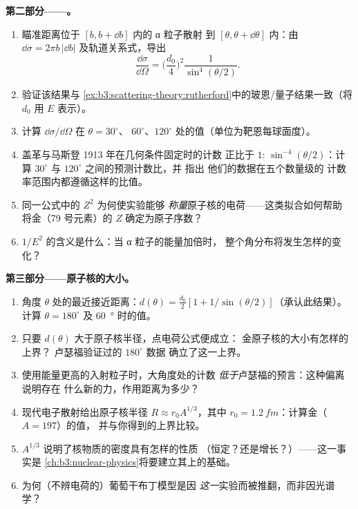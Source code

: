 \begin{problem}
\medskip\noindent\textbf{第二部分——。}
\begin{enumerate}[resume]
  \item 瞄准距离位于 $[b, b + \dd b]$ 内的 α 粒子散射
        到 $[\theta, \theta + \dd\theta]$ 内：由 $\dd\sigma =
        2\pi b\,|\dd b|$ 及轨道关系式，导出
        \[
        \frac{\dd\sigma}{\dd\Omega} =
        \Big(\frac{d_0}{4}\Big)^2\frac{1}{\sin^4(\theta/2)} .
        \]
  \item 验证该结果与
        \cref{ex:b3:scattering-theory:rutherford}中的玻恩/量子结果一致（将 $d_0$
        用 $E$ 表示）。
  \item 计算 $\dd\sigma/\dd\Omega$ 在 $\theta = 30^\circ$、
        $60^\circ$、$120^\circ$ 处的值（单位为靶恩每球面度）。
  \item 盖革与马斯登 1913 年在几何条件固定时的计数
        正比于 $1{:}\,\sin^{-4}(\theta/2)$：计算
        $30^\circ$ 与 $120^\circ$ 之间的预测计数比，并
        指出
        他们的数据在五个数量级的
        计数率范围内都遵循这样的比值。
  \item 同一公式中的 $Z^2$ 为何使实验能够
        \emph{称量}原子核的电荷——这类拟合如何帮助
        将金（79 号元素）的 $Z$ 确定为原子序数？
  \item $1/E^2$ 的含义是什么：当 α 粒子的能量加倍时，
        整个角分布将发生怎样的变化？
\end{enumerate}

\medskip\noindent\textbf{第三部分——原子核的大小。}
\begin{enumerate}[resume]
  \item 角度 $\theta$ 处的最近接近距离：$d(\theta) =
        \tfrac{d_0}2[1 + 1/\sin(\theta/2)]$（承认此结果）。计算
        $\theta = 180^\circ$ 及 \qty{60}{\degree} 时的值。
  \item 只要 $d(\theta)$ 大于原子核半径，点电荷公式便成立：
        金原子核的大小有怎样的上界？
        卢瑟福验证过的 $180^\circ$ 数据
        确立了这一上界。
  \item 使用能量更高的入射粒子时，大角度处的计数
        \emph{低于}卢瑟福的预言：这种偏离说明存在
        什么新的力，作用距离为多少？
  \item 现代电子散射给出原子核半径 $R
        \approx r_0A^{1/3}$，其中 $r_0 = \qty{1.2}{fm}$：计算金（$A = 197$）的值，
        并与你得到的上界比较。
  \item $A^{1/3}$ 说明了核物质的密度具有怎样的性质
        （恒定？还是增长？）——这一事实是
        \cref{ch:b3:nuclear-physics}将要建立其上的基础。
  \item 为何（不辨电荷的）葡萄干布丁模型是因
        \emph{这一}实验而被推翻，而非因光谱学？
\end{enumerate}


\end{problem}
